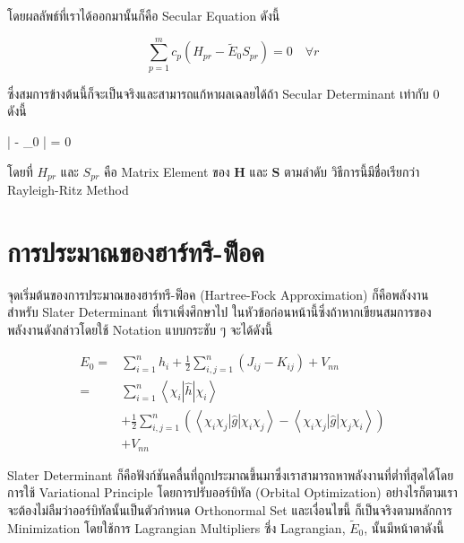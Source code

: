 \noindent โดยผลลัพธ์ที่เราได้ออกมานั้นก็คือ Secular Equation ดังนี้

\begin{equation}
  \sum_{p=1}^{m} c_{p} \left( H_{pr} - \tilde{E}_{0} S_{pr} \right)
  =
  0 \quad \forall r
\end{equation}

\noindent ซึ่งสมการข้างต้นนี้ก็จะเป็นจริงและสามารถแก้หาผลเฉลยได้ถ้า Secular Determinant เท่ากับ 0 ดังนี้

\begin{tcolorbox}
  | - _{0} | = 0
\end{tcolorbox}

\noindent โดยที่ $H_{pr}$ และ $S_{pr}$ คือ Matrix Element ของ $\boldsymbol{H}$ และ $\boldsymbol{S}$ ตามลำดับ
วิธีการนี้มีชื่อเรียกว่า Rayleigh-Ritz Method

\section{การประมาณของฮาร์ทรี-ฟ็อค}

จุดเริ่มต้นของการประมาณของฮาร์ทรี-ฟ็อค (Hartree-Fock Approximation) ก็คือพลังงานสำหรับ Slater Determinant ที่เราเพิ่งศึกษาไป%
ในหัวข้อก่อนหน้านี้ซึ่งถ้าหากเขียนสมการของพลังงานดังกล่าวโดยใช้ Notation แบบกระชับ ๆ จะได้ดังนี้

\begin{equation}
  \begin{aligned}
    \label{eq:energy_slater_determinant_compact}
    E_0
    = & \sum_{i=1}^n h_i
    + \frac{1}{2} \sum_{i, j=1}^n\left(J_{i j}-K_{i j}\right)
    + V_{n n}                                                              \\
    = & \sum_{i=1}^n\left\langle\chi_i|\hat{h}| \chi_i\right\rangle        \\
      & + \frac{1}{2} \sum_{i, j=1}^n
    \left(\left\langle\chi_i \chi_j|\hat{g}| \chi_i \chi_j\right\rangle
    - \left\langle\chi_i \chi_j|\hat{g}| \chi_j \chi_i\right\rangle\right) \\
      & + V_{n n}
  \end{aligned}
\end{equation}

Slater Determinant ก็คือฟังก์ชันคลื่นที่ถูกประมาณขึ้นมาซึ่งเราสามารถหาพลังงานที่ต่ำที่สุดได้โดยการใช้ Variational Principle
โดยการปรับออร์บิทัล (Orbital Optimization) อย่างไรก็ตามเราจะต้องไม่ลืมว่าออร์บิทัลนั้นเป็นตัวกำหนด Orthonormal Set และเงื่อนไขนี้%
ก็เป็นจริงตามหลักการ Minimization โดยใช้การ Lagrangian Multipliers ซึ่ง Lagrangian, $\tilde{E}_0$, นั้นมีหน้าตาดังนี้

